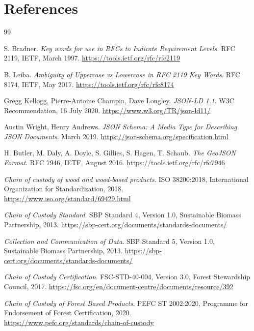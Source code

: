 \documentclass{article}
\begin{document}

\newpage
\section*{References}

\begin{thebibliography}{99}

S. Bradner. \textit{Key words for use in RFCs to Indicate Requirement Levels}. RFC 2119, IETF, March 1997. 
\url{https://tools.ietf.org/rfc/rfc2119}

B. Leiba. \textit{Ambiguity of Uppercase vs Lowercase in RFC 2119 Key Words}. RFC 8174, IETF, May 2017.
\url{https://tools.ietf.org/rfc/rfc8174}

Gregg Kellogg, Pierre-Antoine Champin, Dave Longley. \textit{JSON-LD 1.1}. W3C Recommendation, 16 July 2020.
\url{https://www.w3.org/TR/json-ld11/}

Austin Wright, Henry Andrews. \textit{JSON Schema: A Media Type for Describing JSON Documents}. March 2019.
\url{https://json-schema.org/specification.html}

H. Butler, M. Daly, A. Doyle, S. Gillies, S. Hagen, T. Schaub. \textit{The GeoJSON Format}. RFC 7946, IETF, August 2016.
\url{https://tools.ietf.org/rfc/rfc7946}

\textit{Chain of custody of wood and wood-based products}. ISO 38200:2018, International Organization for Standardization, 2018.
\url{https://www.iso.org/standard/69429.html}

\textit{Chain of Custody Standard}. SBP Standard 4, Version 1.0, Sustainable Biomass Partnership, 2013.
\url{https://sbp-cert.org/documents/standards-documents/}

\textit{Collection and Communication of Data}. SBP Standard 5, Version 1.0, Sustainable Biomass Partnership, 2013.
\url{https://sbp-cert.org/documents/standards-documents/}

\textit{Chain of Custody Certification}. FSC-STD-40-004, Version 3.0, Forest Stewardship Council, 2017.
\url{https://fsc.org/en/document-centre/documents/resource/392}

\textit{Chain of Custody of Forest Based Products}. PEFC ST 2002:2020, Programme for Endorsement of Forest Certification, 2020.
\url{https://www.pefc.org/standards/chain-of-custody}


\end{thebibliography}
\end{document}
